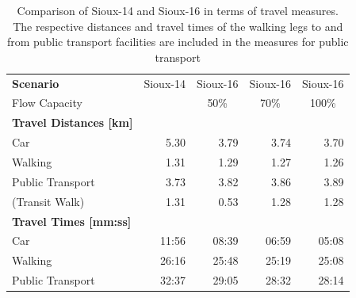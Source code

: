 \begin{table}[]
\centering
\caption{Comparison of Sioux-14 and Sioux-16 in terms of travel measures. The respective
distances and travel times of the walking legs to and from public transport facilities
are included in the measures for public transport}
\label{tab:sioux}
\begin{tabular}{@{}lrrrr@{}}
\toprule
\textbf{Scenario}                  & \multicolumn{1}{c}{Sioux-14} & \multicolumn{1}{c}{Sioux-16} & \multicolumn{1}{c}{Sioux-16} & \multicolumn{1}{c}{Sioux-16} \\
Flow Capacity                      & \multicolumn{1}{c}{}         & \multicolumn{1}{c}{50\%}     & \multicolumn{1}{c}{70\%}     & \multicolumn{1}{c}{100\%}    \\ \midrule
\textbf{Travel Distances {[}km{]}} & \multicolumn{1}{l}{}         & \multicolumn{1}{l}{}         & \multicolumn{1}{l}{}         & \multicolumn{1}{l}{}         \\
Car                                & 5.30                         & 3.79                         & 3.74                         & 3.70                         \\
Walking                            & 1.31                         & 1.29                         & 1.27                         & 1.26                         \\
Public Transport                   & 3.73                         & 3.82                         & 3.86                         & 3.89                         \\
(Transit Walk)                     & 1.31                         & 0.53                         & 1.28                         & 1.28                         \\\midrule
\textbf{Travel Times {[}mm:ss{]}}  & \multicolumn{1}{l}{}         & \multicolumn{1}{l}{}         & \multicolumn{1}{l}{}         & \multicolumn{1}{l}{}         \\
Car                                & 11:56                        & 08:39                        & 06:59                        & 05:08                        \\
Walking                            & 26:16                        & 25:48                        & 25:19                        & 25:08                        \\
Public Transport                   & 32:37                        & 29:05                        & 28:32                        & 28:14                        \\

\end{tabular}
\end{table}
